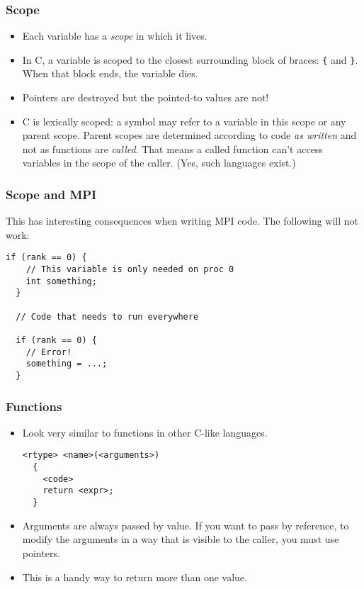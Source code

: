 \begin{frame}
  \frametitle{Scope}
  \begin{itemize}
  \item Each variable has a \emph{scope} in which it lives.
  \item In C, a variable is scoped to the closest surrounding block of braces:
    \texttt{\{} and \texttt{\}}. When that block ends, the variable dies.
  \item Pointers are destroyed but the pointed-to values are not!
  \item C is lexically scoped: a symbol may refer to a variable in this scope or
    any parent scope. Parent scopes are determined according to code
    \emph{as written} and not as functions are \emph{called}. That means a
    called function can't access variables in the scope of the caller. (Yes,
    such languages exist.)
  \end{itemize}
\end{frame}

\begin{frame}[fragile]
  \frametitle{Scope and MPI}
  This has interesting consequences when writing MPI code. The following will
  not work:
\begin{lstlisting}[style=c]
  if (rank == 0) {
    // This variable is only needed on proc 0
    int something;
  }

  // Code that needs to run everywhere

  if (rank == 0) {
    // Error!
    something = ...;
  }
\end{lstlisting}
\end{frame}

\begin{frame}[fragile]
  \frametitle{Functions}
  \begin{itemize}
  \item Look very similar to functions in other C-like languages.
\begin{lstlisting}[style=c]
  <rtype> <name>(<arguments>)
  {
    <code>
    return <expr>;
  }
\end{lstlisting}
  \item Arguments are always passed by value. If you want to pass by reference,
    to modify the arguments in a way that is visible to the caller, you must use
    pointers.
  \item This is a handy way to return more than one value.
  \end{itemize}
\end{frame}

